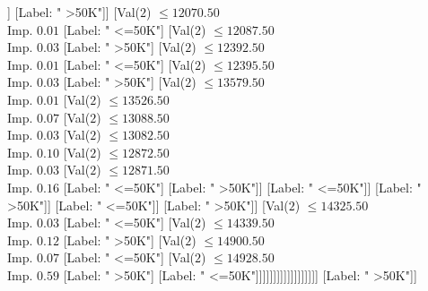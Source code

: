 \documentclass[margin=10pt]{standalone}
\begin{document}
\begin{forest}
																						[Val($2$) $ \leq 11722.50$ \\ Imp. $0.32$
																							[Val($2$) $ \leq 11702.50$ \\ Imp. $0.31$
																								[Label: " >50K"]
																								[Label: " <=50K"]]
																							[Label: " >50K"]]
																						[Val($2$) $ \leq 12070.50$ \\ Imp. $0.01$
																							[Label: " <=50K"]
																							[Val($2$) $ \leq 12087.50$ \\ Imp. $0.03$
																								[Label: " >50K"]
																								[Val($2$) $ \leq 12392.50$ \\ Imp. $0.01$
																									[Label: " <=50K"]
																									[Val($2$) $ \leq 12395.50$ \\ Imp. $0.03$
																										[Label: " >50K"]
																										[Val($2$) $ \leq 13579.50$ \\ Imp. $0.01$
																											[Val($2$) $ \leq 13526.50$ \\ Imp. $0.07$
																												[Val($2$) $ \leq 13088.50$ \\ Imp. $0.03$
																													[Val($2$) $ \leq 13082.50$ \\ Imp. $0.10$
																														[Val($2$) $ \leq 12872.50$ \\ Imp. $0.03$
																															[Val($2$) $ \leq 12871.50$ \\ Imp. $0.16$
																																[Label: " <=50K"]
																																[Label: " >50K"]]
																															[Label: " <=50K"]]
																														[Label: " >50K"]]
																													[Label: " <=50K"]]
																												[Label: " >50K"]]
																											[Val($2$) $ \leq 14325.50$ \\ Imp. $0.03$
																												[Label: " <=50K"]
																												[Val($2$) $ \leq 14339.50$ \\ Imp. $0.12$
																													[Label: " >50K"]
																													[Val($2$) $ \leq 14900.50$ \\ Imp. $0.07$
																														[Label: " <=50K"]
																														[Val($2$) $ \leq 14928.50$ \\ Imp. $0.59$
																															[Label: " >50K"]
																															[Label: " <=50K"]]]]]]]]]]]]]]]]]]
														[Label: " >50K"]]

\end{forest}
\end{document}

